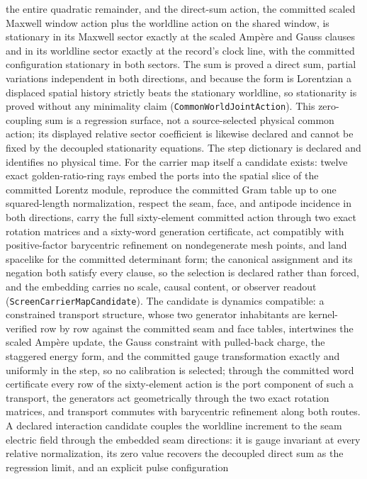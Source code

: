 \documentclass[11pt]{article}
\begin{document}
the entire quadratic remainder, and the direct-sum action, the committed scaled
Maxwell window action plus the worldline action on the shared window, is
stationary in its Maxwell sector exactly at the scaled Amp\`ere and Gauss
clauses and in its worldline sector exactly at the record's clock line,
with the committed configuration stationary in both sectors. The sum is proved a
direct sum, partial variations independent in both directions, and because
the form is Lorentzian a displaced spatial history strictly beats the
stationary worldline, so stationarity is proved without any minimality
claim (\texttt{CommonWorldJointAction}). This zero-coupling
sum is a regression surface, not a source-selected physical common action;
its displayed relative sector coefficient is likewise declared and cannot be
fixed by the decoupled stationarity equations.
The step dictionary is declared and identifies no physical time. For the
carrier map itself a candidate exists: twelve exact golden-ratio-ring rays
embed the ports into the spatial slice of the committed Lorentz module,
reproduce the committed Gram table up to one squared-length normalization,
respect the seam, face, and antipode incidence in both directions, carry
the full sixty-element committed action through two exact rotation matrices
and a sixty-word generation certificate, act compatibly with positive-factor
barycentric refinement on nondegenerate mesh points, and land spacelike for
the committed determinant form; the
canonical assignment and its negation both satisfy every clause, so the
selection is declared rather than forced, and the embedding carries no
scale, causal content, or observer readout
(\texttt{ScreenCarrierMapCandidate}). The candidate is
dynamics compatible: a constrained transport structure, whose two
generator inhabitants are kernel-verified row by row against the committed
seam and face tables, intertwines the scaled Amp\`ere update, the Gauss
constraint with pulled-back charge, the staggered energy form, and the
committed gauge transformation exactly and uniformly in the step, so no
calibration is selected; through the committed word certificate every row
of the sixty-element action is the port component of such a transport, the
generators act geometrically through the two exact rotation matrices, and
transport commutes with barycentric refinement along both routes. A
declared interaction candidate couples the worldline increment to the seam
electric field through the embedded seam directions: it is gauge invariant
at every relative normalization, its zero value recovers the decoupled
direct sum as the regression limit, and an explicit pulse configuration
\end{document}
